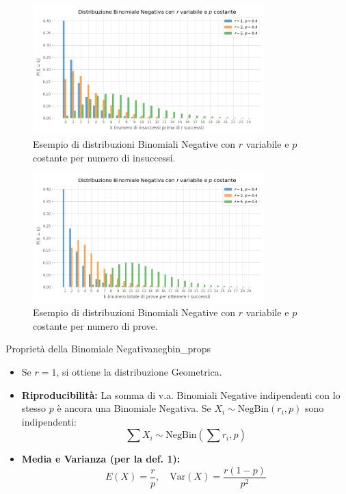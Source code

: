 \begin{figure}[H]
    \centering
    \includegraphics[width=0.8\textwidth]{images/th_01_03/negbin.png}
    \caption{Esempio di distribuzioni Binomiali Negative con \(r\) variabile e \(p\) costante per numero di insuccessi.}
    \label{fig:negbin}
\end{figure}


\begin{figure}[H]
    \centering
    \includegraphics[width=0.8\textwidth]{images/th_01_03/negbin_trials.png}
    \caption{Esempio di distribuzioni Binomiali Negative con \(r\) variabile e \(p\) costante per numero di prove.}
    \label{fig:negbin_trials}
\end{figure}

\begin{proposizione}{Proprietà della Binomiale Negativa}{negbin_props}
\begin{itemize}
    \item Se \(r=1\), si ottiene la distribuzione Geometrica.
    \item \textbf{Riproducibilità:} La somma di v.a. Binomiali Negative indipendenti con lo stesso \(p\) è ancora una Binomiale Negativa. Se \(X_i \sim \text{NegBin}(r_i, p)\) sono indipendenti:
    \[ \sum X_i \sim \text{NegBin}\left(\sum r_i, p\right) \]
    \item \textbf{Media e Varianza (per la def. 1):}
    \[ E(X) = \frac{r}{p}, \quad \text{Var}(X) = \frac{r(1-p)}{p^2} \]
\end{itemize}
\end{proposizione}
